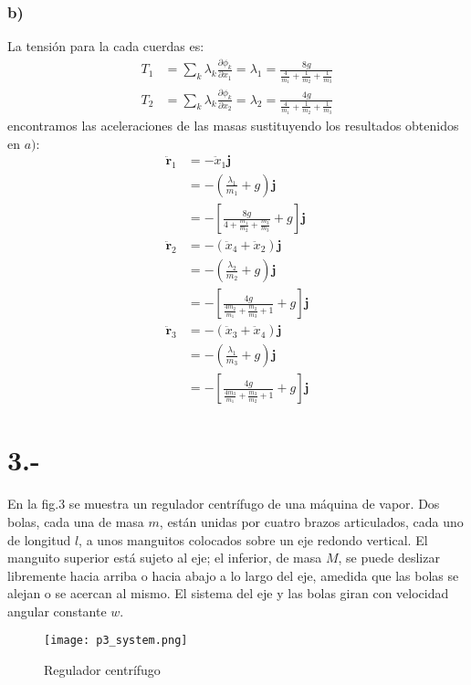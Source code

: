 \documentclass{article}
\begin{document}
\begin{tcolorbox}[breakable]
    \subsubsection*{b)}
    La tensión para la cada cuerdas es:
    \begin{align*}
        T_1 &= \sum_k \lambda_k \frac{\partial \phi_k}{\partial x_1} = \lambda_1 = \frac{8g}{\tfrac{4}{m_1}+\tfrac{1}{m_2}+\tfrac{1}{m_3}}  \\
        T_2 &= \sum_k \lambda_k \frac{\partial \phi_k}{\partial x_2} = \lambda_2 = \frac{4g}{\tfrac{4}{m_1}+\tfrac{1}{m_2}+\tfrac{1}{m_3}} 
    \end{align*}
    encontramos las aceleraciones de las masas sustituyendo los resultados obtenidos en $a)$:
    \begin{align*}
        \bm{\ddot{r}}_1 
        &= -\ddot{x}_1\bm{j} \\
        &= -(\tfrac{\lambda_1}{m_1} + g)\bm{j} \\
        &= -\left[\frac{8g}{4+\tfrac{m_1}{m_2}+\tfrac{m_3}{m_3}}+g\right] \bm{j} \\
        \bm{\ddot{r}}_2 
        &= -(\ddot{x}_4+\ddot{x}_2)\bm{j} \\
        &= -(\tfrac{\lambda_2}{m_2} + g)\bm{j} \\
        &= -\left[\frac{4g}{\tfrac{4m_2}{m_1}+\tfrac{m_2}{m_3}+1} +g\right] \bm{j}\\
        \bm{\ddot{r}}_3 
        &= -(\ddot{x}_3+\ddot{x}_4)\bm{j} \\
        &= -(\tfrac{\lambda_1}{m_3} + g)\bm{j} \\
        &= -\left[\frac{4g}{\tfrac{4m_3}{m_1}+\tfrac{m_3}{m_2}+1}+g\right]\bm{j}
    \end{align*}
\end{tcolorbox}
\newpage
\section*{3.-}
En la fig.3 se muestra un regulador centrífugo de una máquina de vapor. Dos bolas, cada una de masa $m$, están unidas por cuatro brazos articulados, 
cada uno de longitud $l$, a unos manguitos colocados sobre un eje redondo vertical. El manguito superior está sujeto al eje; el inferior, de masa $M$, 
se puede deslizar libremente hacia arriba o hacia abajo a lo largo del eje, amedida que las bolas se alejan o se acercan al mismo. 
El sistema del eje y las bolas giran con velocidad angular constante $w$.
\begin{figure}[H]
    \centering
    \texttt{[image: p3\_system.png]}
    \caption{Regulador centrífugo}
\end{figure}
\end{document}
